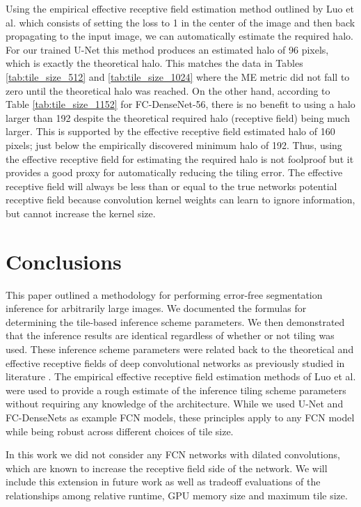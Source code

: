 \documentclass[10pt, indentfirst]{article}
\begin{document}
Using the empirical effective receptive field estimation method outlined by Luo et al. \citep{Luo2016} which consists of setting the loss to 1 in the center of the image and then back propagating to the input image, we can automatically estimate the required halo.
For our trained U-Net \citep{Ronneberger2015a} this method produces an estimated halo of 96 pixels, which is exactly the theoretical halo.
This matches the data in Tables \ref{tab:tile_size_512} and \ref{tab:tile_size_1024} where the ME metric did not fall to zero until the theoretical halo was reached.
On the other hand, according to Table \ref{tab:tile_size_1152} for FC-DenseNet-56, there is no benefit to using a halo larger than 192 despite the theoretical required halo (receptive field) being much larger.
This is supported by the effective receptive field estimated halo of 160 pixels; just below the empirically discovered minimum halo of 192.
Thus, using the effective receptive field for estimating the required halo is not foolproof but it provides a good proxy for automatically reducing the tiling error.
The effective receptive field will always be less than or equal to the true networks potential receptive field because convolution kernel weights can learn to ignore information, but cannot increase the kernel size.


\section{Conclusions}
\label{conclusion}

This paper outlined a methodology for performing error-free segmentation inference for arbitrarily large images.
We documented the formulas for determining the tile-based inference scheme parameters.
We then demonstrated that the inference results are identical regardless of whether or not tiling was used.
These inference scheme parameters were related back to the theoretical and effective receptive fields of deep convolutional networks as previously studied in literature \citep{Luo2016}.
The empirical effective receptive field estimation methods of Luo et al. \citep{Luo2016} were used to provide a rough estimate of the inference tiling scheme parameters without requiring any knowledge of the architecture.
While we used U-Net and FC-DenseNets as example FCN models, these principles apply to any FCN model while being robust across different choices of tile size.

In this work we did not consider any FCN networks with dilated convolutions, which are known to increase the receptive field side of the network.
We will include this extension in future work as well as tradeoff evaluations of the relationships among relative runtime, GPU memory size and maximum tile size.
\end{document}

